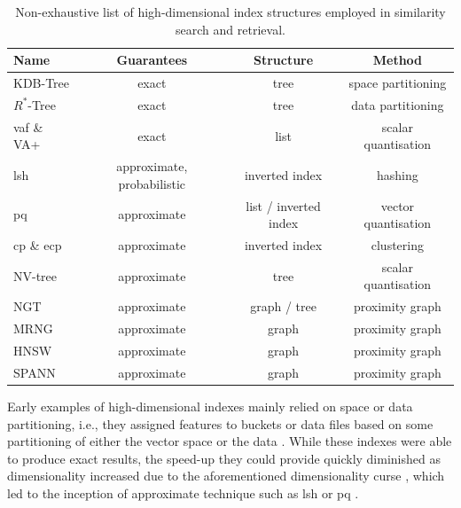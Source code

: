 \begin{table}
    \begin{tabular}{ | l | c | c | c |}
        \hline
        \textbf{Name} & \textbf{Guarantees} & \textbf{Structure} & \textbf{Method} \\
        \hline
        \hline
        KDB-Tree \cite{Robinson:1981KDB} & exact & tree & space partitioning \\  
        \hline
        $R^{*}$-Tree \cite{Beckmann:1990RTree} & exact & tree & data partitioning \\ 
        \hline
        \acrshort{vaf} \& VA+ \cite{Weber:1998Va,Ferhatosmanoglu:2000Vector} & exact & list & scalar quantisation \\ 
        \hline
        \acrshort{lsh} \cite{Indyk1998:Approximate, Wang:2017ASurvey} & approximate, probabilistic & inverted index & hashing \\ 
        \hline
        \acrshort{pq} \cite{Jegou:2010Product} & approximate & list / inverted index & vector quantisation \\
        \hline 
        \acrshort{cp} \& e\acrshort{cp} \cite{Chierichetti:2007Finding,Gudmundsson:2010Large} & approximate & inverted index & clustering \\ 
        \hline
        NV-tree \cite{Lejsek:2009NVTree} & approximate & tree & scalar quantisation \\ 
        \hline
        NGT \cite{Iwasaki2016:Pruned} & approximate & graph / tree & proximity graph \\ 
        \hline
        MRNG \cite{Lejsek:2009NVTree} & approximate & graph & proximity graph \\ 
        \hline
        HNSW \cite{Malkov:2018Efficient} & approximate & graph & proximity graph \\ 
        \hline
        SPANN \cite{Chen:2021SPANN} & approximate & graph & proximity graph \\ 
        \hline
    \end{tabular}
    \caption{Non-exhaustive list of high-dimensional index structures employed in similarity search and retrieval.}
    \label{table:index_structures}
\end{table}

Early examples of high-dimensional indexes mainly relied on space or data partitioning, i.e., they assigned features to buckets or data files based on some partitioning of either the vector space \cite{Bentley:1975Multidimensional,Robinson:1981KDB,Finkel:1974Quad} or the data \cite{Guttmann:1984RTrees,Beckmann:1990RTree,Ciaccia:1997Mtree}. While these indexes were able to produce exact results, the speed-up they could provide quickly diminished as dimensionality increased due to the aforementioned dimensionality curse \cite{Shaft:2006Theory}, which led to the inception of approximate technique such as \acrshort{lsh} \cite{Indyk1998:Approximate} or \acrshort{pq} \cite{Jegou:2010Product}.

